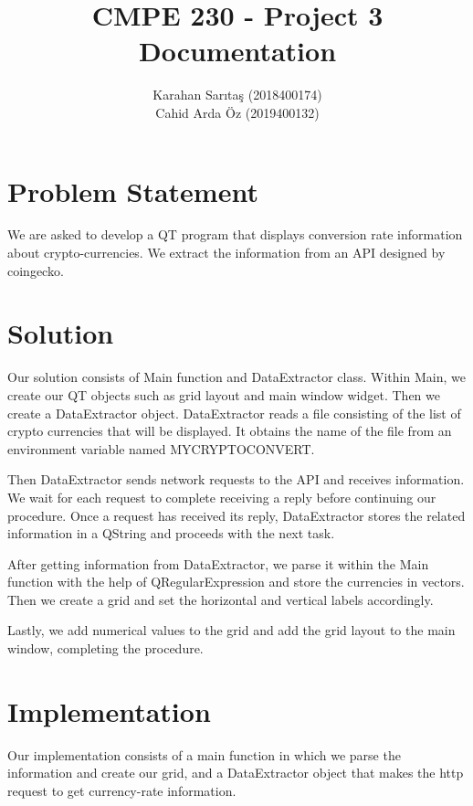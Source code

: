 \documentclass[12pt,a4paper]{article}
\title{CMPE 230 - Project 3 Documentation}
\author{Karahan Sarıtaş (2018400174) \\ Cahid Arda Öz (2019400132)}
\begin{document}
\maketitle

\tableofcontents

\section{Problem Statement}

We are asked to develop a QT program that displays conversion rate information about crypto-currencies. We extract the information from an API designed by coingecko.\par

\section{Solution}

Our solution consists of Main function and DataExtractor class. Within Main, we create our QT objects such as grid layout and main window widget. Then we create a DataExtractor object. 
DataExtractor reads a file consisting of the list of crypto currencies that will be displayed. It obtains the name of the file from an environment variable named MYCRYPTOCONVERT. \par
Then DataExtractor sends network requests to the API and receives information. We wait for each request to complete receiving a reply before continuing our procedure. Once a request has received its reply, DataExtractor stores the related information in a QString and proceeds with the next task.\par
After getting information from DataExtractor, we parse it within the Main function with the help of QRegularExpression and store the currencies in vectors. Then we create a grid and set the horizontal and vertical labels accordingly. \par
Lastly, we add numerical values to the grid and add the grid layout to the main window, completing the procedure. \par

\section{Implementation}

Our implementation consists of a main function in which we parse the information and create our grid, and a DataExtractor object that makes the http request to get currency-rate information. \par
\end{document}
